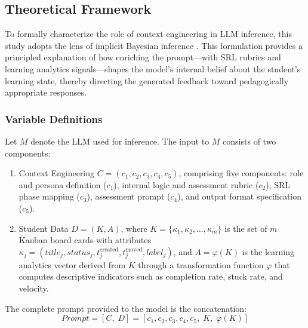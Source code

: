 \documentclass[conference,a4paper]{IEEEtran}
\begin{document}

\subsection{Theoretical Framework}\label{sec:framework}

To formally characterize the role of context engineering 
in LLM inference, this study adopts the lens of implicit 
Bayesian inference \cite{xie2022explanation}. This 
formulation provides a principled explanation of how 
enriching the prompt—with SRL rubrics and learning 
analytics signals—shapes the model's internal belief 
about the student's learning state, thereby directing the 
generated feedback toward pedagogically appropriate 
responses.

\subsubsection{Variable Definitions}

Let $M$ denote the LLM used for inference. The input 
to $M$ consists of two components:

\begin{enumerate}
    \item Context Engineering 
    $C = (c_1, c_2, c_3, c_4, c_5)$, comprising five 
    components: role and persona definition ($c_1$), 
    internal logic and assessment rubric ($c_2$), SRL 
    phase mapping ($c_3$), assessment prompt ($c_4$), 
    and output format specification ($c_5$).

    \item Student Data $D = (K, A)$, where 
    $K = \{\kappa_1, \kappa_2, \ldots, \kappa_m\}$ is 
    the set of $m$ Kanban board cards with attributes 
    $\kappa_j = (\textit{title}_j, \textit{status}_j, 
    t_j^{\text{created}}, t_j^{\text{moved}}, 
    \textit{label}_j)$, and $A = \varphi(K)$ is the 
    learning analytics vector derived from $K$ through 
    a transformation function $\varphi$ that computes 
    descriptive indicators such as completion rate, 
    stuck rate, and velocity.
\end{enumerate}

The complete prompt provided to the model is the 
concatenation:
\begin{equation}\label{eq:prompt}
    \textit{Prompt} = [C,\; D] = 
    [c_1, c_2, c_3, c_4, c_5,\; K,\; \varphi(K)]
\end{equation}
\end{document}
